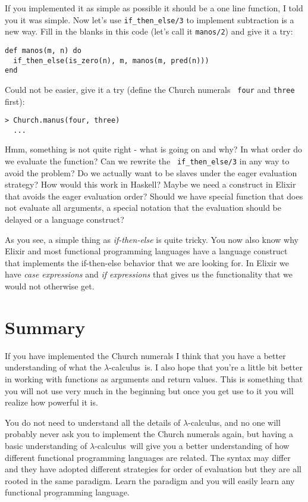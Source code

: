 \documentclass[a4paper,11pt]{article}
\newcommand{\lamc}[0]{$\lambda$-calculus}
\begin{document}
If you implemented it as simple as possible it should be a one line
function, I told you it was simple. Now let's use {\tt if_then_else/3}
to implement subtraction is a new way. Fill in the blanks in this code
(let's call it {\tt manos/2}) and give it a try:

\begin{verbatim}
def manos(m, n) do
  if_then_else(is_zero(n), m, manos(m, pred(n)))
end
\end{verbatim}

Could not be easier, give it a try (define the Church numerals {\tt
  four} and {\tt three} first):
  
\begin{verbatim}
> Church.manus(four, three)
  ...
\end{verbatim}

Hmm, something is not quite right - what is going on and why? In what
order do we evaluate the function?  Can we rewrite the {\tt
  if_then_else/3} in any way to avoid the problem? Do we actually want
to be slaves under the eager evaluation strategy? How would this work
in Haskell?  Maybe we need a construct in Elixir that avoids the eager
evaluation order? Should we have special function that does not
evaluate all arguments, a special notation that the evaluation should
be delayed or a language construct?

As you see, a simple thing as {\em if-then-else} is quite tricky. You
now also know why Elixir and most functional programming languages have
a language construct that implements the if-then-else behavior that we
are looking for. In Elixir we have {\em case expressions} and {\em if
  expressions} that gives us the functionality that we would not
otherwise get.



\section{Summary}

If you have implemented the Church numerals I think that you have a
better understanding of what the \lamc\ is. I also hope that you're a
little bit better in working with functions as arguments and return
values. This is something that you will not use very much in the
beginning but once you get use to it you will realize how powerful it
is.

You do not need to understand all the details of \lamc , and no one
will probably never ask you to implement the Church numerals again,
but having a basic understanding of \lamc\ will give you a better
understanding of how different functional programming languages are
related. The syntax may differ and they have adopted different
strategies for order of evaluation but they are all rooted in the same
paradigm. Learn the paradigm and you will easily learn any functional
programming language.
\end{document}
